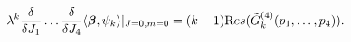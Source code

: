 \begin{equation}
\lambda^{k}\frac{\delta}{\delta J_{1}}\dots\frac{\delta}{\delta J_{4}}\langle\boldsymbol\beta, \psi_{k}\rangle|_{J=0,m=0}=(k-1){\text Res}({\tilde G}_{k}^{(4)}(p_1, \dots, p_{4})).%
\label{z.5}
\end{equation}

